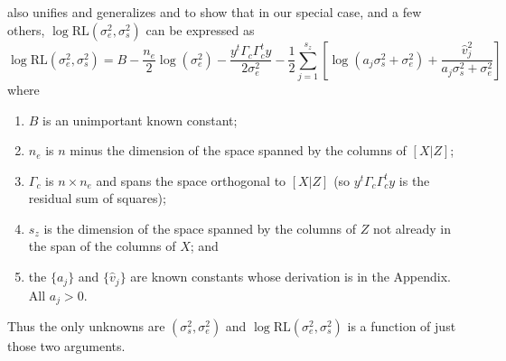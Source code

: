 \documentclass[ejs]{imsart}
\newcommand{\RLorig}{\text{RL}}
\newcommand{\logRLorig}{\log\RLorig}
\newcommand{\sigssq}{\sigma_s^2}
\newcommand{\sigesq}{\sigma_e^2}
\newcommand{\logRLssorig}{\logRLorig(\sigesq,\sigssq)}
\newcommand{\ass}{a_j\sigssq + \sigesq}
\begin{document}
\cite{hodges:2013} also unifies and generalizes \cite{reich_hodges:2008} and \cite{welham_thompson:2009} to show that in our special case, and a few others, $\logRLssorig$ can be expressed as
\begin{equation}
\label{eq:reexpress}
  \logRLssorig = B - \frac{n_e}{2}\log(\sigesq) - \frac{y^t \Gamma_c \Gamma^t_c y}{2\sigesq} 
    - \frac{1}{2} \sum_{j=1}^{s_z} \left[ \log(\ass) + \frac{\hat v_j^2}{\ass}\right]
\end{equation}
where
\begin{enumerate}[label=(\arabic*)]
  \item $B$ is an unimportant known constant;
  \item $n_e$ is $n$ minus the dimension of the space spanned by the columns of $[X|Z]$;
  \item $\Gamma_c$ is $n \times n_e$ and spans the space orthogonal to $[X|Z]$
    (so $y^t \Gamma_c \Gamma^t_c y$ is the residual sum of squares);
  \item $s_z$ is the dimension of the space spanned by the columns of $Z$ not already
    in the span of the columns of $X$; and
  \item the $\{a_j\}$ and $\{\hat v_j\}$ are known constants whose derivation is in the Appendix.  All $a_j>0$.
\end{enumerate}
Thus the only unknowns are $(\sigma^2_s, \sigma^2_e)$ and $\logRLssorig$ is a function of just those two arguments.
\end{document}
